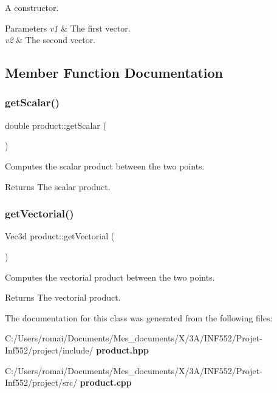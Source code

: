 A constructor. 


\begin{DoxyParams}{Parameters}
{\em v1} & The first vector. \\
\hline
{\em v2} & The second vector. \\
\hline
\end{DoxyParams}


\subsection{Member Function Documentation}
\mbox{\label{classproduct_a74c606ec2a03f632c6f86a5feac41834}} 
\subsubsection{get\+Scalar()}
{\footnotesize\ttfamily double product\+::get\+Scalar (\begin{DoxyParamCaption}{ }\end{DoxyParamCaption})}



Computes the scalar product between the two points. 

\begin{DoxyReturn}{Returns}
The scalar product. 
\end{DoxyReturn}
\mbox{\label{classproduct_a22749e150ec6baffd629cd037bbf72cd}} 
\subsubsection{get\+Vectorial()}
{\footnotesize\ttfamily Vec3d product\+::get\+Vectorial (\begin{DoxyParamCaption}{ }\end{DoxyParamCaption})}



Computes the vectorial product between the two points. 

\begin{DoxyReturn}{Returns}
The vectorial product. 
\end{DoxyReturn}


The documentation for this class was generated from the following files\+:\begin{DoxyCompactItemize}
\item 
C\+:/\+Users/romai/\+Documents/\+Mes\+\_\+documents/\+X/3\+A/\+I\+N\+F552/\+Projet-\/\+Inf552/project/include/\textbf{ product.\+hpp}\item 
C\+:/\+Users/romai/\+Documents/\+Mes\+\_\+documents/\+X/3\+A/\+I\+N\+F552/\+Projet-\/\+Inf552/project/src/\textbf{ product.\+cpp}\end{DoxyCompactItemize}
